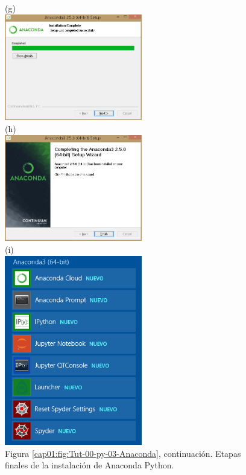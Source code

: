 \documentclass[10pt,a4paper]{article}\usepackage[]{graphicx}\usepackage[]{color}
\newcounter {cont01}
\begin{document}
\begin{figure}[p]
\begin{center}
(g)\\[1cm]
\includegraphics[width=6cm]{../fig/Tut-00-py-09-Anaconda.png}\\[1cm]
(h)\\[1cm]
\includegraphics[width=6cm]{../fig/Tut-00-py-10-Anaconda.png}\\[1cm]
(i)\\[1cm]
\includegraphics[width=6cm]{../fig/Tut-00-py-11-Anaconda.png}\\[1cm]
{Figura \ref{cap01:fig:Tut-00-py-03-Anaconda}, continuación. Etapas finales de la instalación de Anaconda Python.}
\end{center}
\end{figure}
\end{document}
